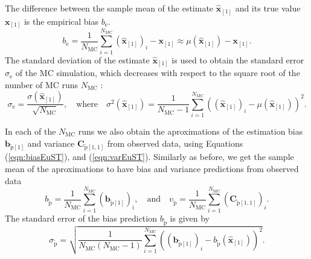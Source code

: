 The difference between the sample mean of the estimate $\widehat{\mathbf{x}}_{\left[1\right]}$ and its true value $\mathbf{x}_{\left[1\right]}$ is the empirical bias $b_\mathrm{e}$.
\begin{equation} {b}_\mathrm{e} = \frac{1}{N_{\mathrm{MC}}} \sum_{i=1}^{N_{\mathrm{MC}}}{ \left( \widehat{\mathbf{x}}_{\left[1\right]} \right)_i -  \mathbf{x}_{\left[1\right]} } \approx \mu \left( \widehat{\mathbf{x}}_{\left[1\right]} \right) - \mathbf{x}_{\left[1\right]} . \end{equation}
The standard deviation of the estimate $\widehat{\mathbf{x}}_{\left[1\right]}$ is used to obtain the standard error $\sigma_\mathrm{e}$ of the MC simulation, which decreases with respect to the square root of the number of MC runs $N_{\mathrm{MC}}$ \cite{Hammersley75}: 
\begin{equation} \sigma_\mathrm{e} = \frac{ \sigma \left( \widehat{\mathbf{x}}_{\left[1\right]} \right) }{\sqrt{N_{\mathrm{MC}}}}, \quad \mathrm{where} \quad \sigma^2 \left( \widehat{\mathbf{x}}_{\left[1\right]} \right) = \frac{1}{N_{\mathrm{MC}}-1} \sum_{i=1}^{N_{\mathrm{MC}}}{ \left( \left( \widehat{\mathbf{x}}_{\left[1\right]} \right)_i - \mu \left( \widehat{\mathbf{x}}_{\left[1\right]} \right) \right)^2 } . \label{eqn:stderr} \end{equation}

In each of the $N_{\mathrm{MC}}$ runs we also obtain the aproximations of the estimation bias $\mathbf{b}_{\widetilde{\mathrm{p}} \left[1\right]}$ and variance $\mathbf{C}_{\widetilde{\mathrm{p}} \left[1,1\right]}$  from observed data, using Equations (\ref{eqn:biasEuST}), and (\ref{eqn:varEuST}).
Similarly as before, we get the sample mean of the aproximations to have bias and variance predictions from observed data 
 \begin{equation} b_{\widetilde{\mathrm{p}}} = \frac{1}{N_{\mathrm{MC}}} \sum_{i=1}^{N_{\mathrm{MC}}}{ \left( \mathbf{b}_{\widetilde{\mathrm{p}} \left[1\right]} \right)_i } , \quad \mathrm{and} 
 \quad v_{\widetilde{\mathrm{p}}}  = \frac{1}{N_{\mathrm{MC}}} \sum_{i=1}^{N_{\mathrm{MC}}}{ \left( \mathbf{C}_{\widetilde{\mathrm{p}} \left[1,1\right]} \right)_i } . \end{equation} 
The standard error of the bias prediction $b_{\widetilde{\mathrm{p}}}$ is given by
\begin{equation} \sigma_{\widetilde{\mathrm{p}}} = \sqrt{ \frac{1}{N_{\mathrm{MC}} \left( N_{\mathrm{MC}}-1 \right)} \sum_{i=1}^{N_{\mathrm{MC}}} { \left( \left( \mathbf{b}_{\widetilde{\mathrm{p}} \left[1\right]} \right)_i - b_{\widetilde{\mathrm{p}}} \left( \widehat{\mathbf{x}}_{\left[1\right]} \right) \right)^2 } } . \end{equation}

